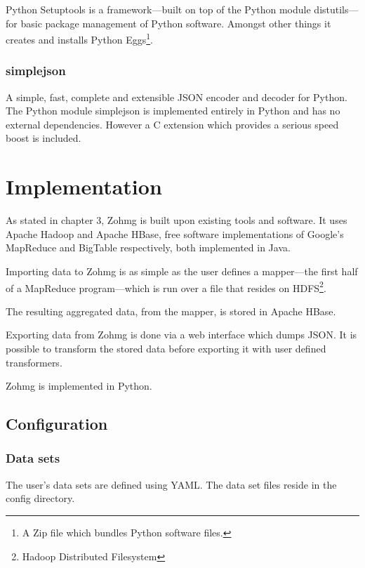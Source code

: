 \documentclass[a4paper,10pt]{book}
\begin{document}
Python Setuptools is a framework---built on top of the Python module
distutils---for basic package management of Python software. Amongst other
things it creates and installs Python Eggs\footnote{A Zip file which
bundles Python software files.}. \cite{setuptools}


\subsection{simplejson}

A simple, fast, complete and extensible JSON encoder and decoder for
Python. The Python module simplejson is implemented entirely in Python and
has no external dependencies. However a C extension which provides a
serious speed boost is included. \cite{simplejson}




\chapter{Implementation}

As stated in chapter 3, Zohmg is built upon existing tools and software.
It uses Apache Hadoop and Apache HBase, free software implementations of
Google's MapReduce and BigTable respectively, both implemented in Java.

Importing data to Zohmg is as simple as the user defines a mapper---the
first half of a MapReduce program---which is run over a file that resides
on HDFS\footnote{Hadoop Distributed Filesystem}.

The resulting aggregated data, from the mapper, is stored in Apache HBase.

Exporting data from Zohmg is done via a web interface which dumps JSON.
It is possible to transform the stored data before exporting it with user
defined transformers.

Zohmg is implemented in Python.



\section{Configuration}

\subsection{Data sets}

The user's data sets are defined using YAML. The data set files reside in
the config directory.
\end{document}

